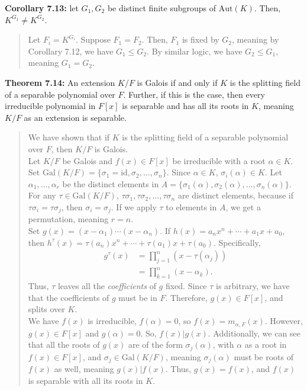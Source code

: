 \documentclass[10pt]{extarticle}
\begin{document}
  \textbf{Corollary 7.13:} let $G_1,G_2$ be distinct finite subgroups of $\text{Aut}(K)$. Then, $K^{G_1}\neq K^{G_2}$.
  \begin{quote}
  Let $F_i = K^{G_i}$. Suppose $F_1 = F_2$. Then, $F_1$ is fixed by $G_2$, meaning by Corollary 7.12, we have $G_1\leq G_2$. By similar logic, we have $G_2 \leq G_1$, meaning $G_1 = G_2$.
  \end{quote}
  \textbf{Theorem 7.14:} An extension $K/F$ is Galois if and only if $K$ is the splitting field of a separable polynomial over $F$. Further, if this is the case, then every irreducible polynomial in $F[x]$ is separable and has all its roots in $K$, meaning $K/F$ as an extension is separable.
  \begin{quote}
    We have shown that if $K$ is the splitting field of a separable polynomial over $F$, then $K/F$ is Galois.\\

    Let $K/F$ be Galois and $f(x)\in F[x]$ be irreducible with a root $\alpha \in K$. Set $\text{Gal}(K/F) =\{\sigma_1 = \text{id}, \sigma_2,\dots,\sigma_n\}$. Since $\alpha\in K$, $\sigma_i(\alpha)\in K$. Let $\alpha_1,\dots,\alpha_r$ be the distinct elements in $A = \{\sigma_1(\alpha),\sigma_2(\alpha),\dots,\sigma_n(\alpha)\}$.\\

    For any $\tau \in \text{Gal}(K/F)$, $\tau\sigma_1,\tau\sigma_2,\dots,\tau\sigma_n$ are distinct elements, because if $\tau\sigma_i = \tau\sigma_j$, then $\sigma_i = \sigma_j$. If we apply $\tau$ to elements in $A$, we get a permutation, meaning $r = n$.\\

    Set $g(x) = (x-\alpha_1)\cdots(x-\alpha_n)$. If $h(x) = a_nx^n + \cdots + a_1x + a_0$, then $h^{\tau}(x) = \tau(a_n)x^n + \cdots + \tau(a_1)x + \tau(a_0)$. Specifically,
    \begin{align*}
      g^{\tau}(x) &= \prod_{j=1}^{n}(x-\tau(\alpha_j))\\
                  &= \prod_{k=1}^{n}(x-\alpha_k).
    \end{align*}
    Thus, $\tau$ leaves all the \textit{coefficients} of $g$ fixed. Since $\tau$ is arbitrary, we have that the coefficients of $g$ must be in $F$. Therefore, $g(x)\in F[x]$, and splits over $K$.\\

    We have $f(x)$ is irreducible, $f(\alpha) = 0$, so $f(x) = m_{\alpha,F}(x)$. However, $g(x) \in F[x]$ and $g(\alpha) = 0$. So, $f(x) | g(x)$. Additionally, we can see that all the roots of $g(x)$ are of the form $\sigma_j(\alpha)$, with $\alpha$ as a root in $f(x) \in F[x]$, and $\sigma_j\in \text{Gal}(K/F)$, meaning $\sigma_j(\alpha)$ must be roots of $f(x)$ as well, meaning $g(x) | f(x)$. Thus, $g(x) = f(x)$, and $f(x)$ is separable with all its roots in $K$.\\


\end{quote}
\end{document}
